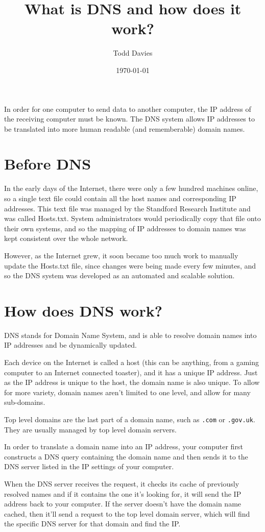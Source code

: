 \documentclass{article}
\author{Todd Davies}
\title{What is DNS and how does it work?}
\date{\today}
\begin{document}
\lhead{\today}

\maketitle

In order for one computer to send data to another computer, the IP address of
the receiving computer must be known. The DNS system allows IP addresses to be
translated into more human readable (and rememberable) domain names.

\section*{Before DNS}

In the early days of the Internet, there were only a few hundred machines
online, so a single text file could contain all the host names and corresponding
IP addresses. This text file was managed by the Standford Research Institute and
was called Hosts.txt. System administrators would periodically copy that file
onto their own systems, and so the mapping of IP addresses to domain names was
kept consistent over the whole network.

However, as the Internet grew, it soon became too much work to manually update
the Hosts.txt file, since changes were being made every few minutes, and so the
DNS system was developed as an automated and scalable solution.

\section*{How does DNS work?}

DNS stands for Domain Name System, and is able to resolve domain names into IP
addresses and be dynamically updated.

Each device on the Internet is called a host (this can be anything, from a
gaming computer to an Internet connected toaster), and it has a unique IP
address. Just as the IP address is unique to the host, the domain name is also
unique. To allow for more variety, domain names aren't limited to one level, and
allow for many sub-domains.

Top level domains are the last part of a domain name, such as \texttt{.com} or
\texttt{.gov.uk}. They are usually managed by top level domain servers.

In order to translate a domain name into an IP address, your computer first
constructs a DNS query containing the domain name and then sends it to the DNS
server listed in the IP settings of your computer.

When the DNS server receives the request, it checks its cache of previously
resolved names and if it contains the one it's looking for, it will send the IP
address back to your computer. If the server doesn't have the domain name
cached, then it'll send a request to the top level domain server, which will
find the specific DNS server for that domain and find the IP.
\end{document}
